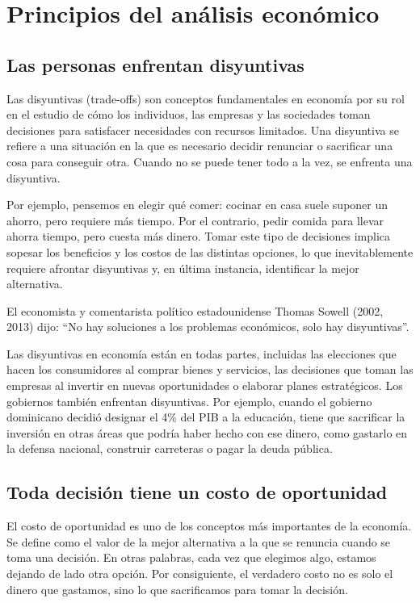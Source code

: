 \documentclass[
  letterpaper,
  DIV=11,
  numbers=noendperiod,
  oneside]{scrreprt}
\begin{document}
\section{Principios del análisis
económico}\label{principios-del-anuxe1lisis-econuxf3mico}

\subsection{Las personas enfrentan
disyuntivas}\label{las-personas-enfrentan-disyuntivas}

Las disyuntivas (trade-offs) son conceptos fundamentales en economía por
su rol en el estudio de cómo los individuos, las empresas y las
sociedades toman decisiones para satisfacer necesidades con recursos
limitados. Una disyuntiva se refiere a una situación en la que es
necesario decidir renunciar o sacrificar una cosa para conseguir otra.
Cuando no se puede tener todo a la vez, se enfrenta una disyuntiva.

Por ejemplo, pensemos en elegir qué comer: cocinar en casa suele suponer
un ahorro, pero requiere más tiempo. Por el contrario, pedir comida para
llevar ahorra tiempo, pero cuesta más dinero. Tomar este tipo de
decisiones implica sopesar los beneficios y los costos de las distintas
opciones, lo que inevitablemente requiere afrontar disyuntivas y, en
última instancia, identificar la mejor alternativa.

El economista y comentarista político estadounidense Thomas Sowell
(2002, 2013) dijo: ``No hay soluciones a los problemas económicos, solo
hay disyuntivas''.

Las disyuntivas en economía están en todas partes, incluidas las
elecciones que hacen los consumidores al comprar bienes y servicios, las
decisiones que toman las empresas al invertir en nuevas oportunidades o
elaborar planes estratégicos. Los gobiernos también enfrentan
disyuntivas. Por ejemplo, cuando el gobierno dominicano decidió designar
el 4\% del PIB a la educación, tiene que sacrificar la inversión en
otras áreas que podría haber hecho con ese dinero, como gastarlo en la
defensa nacional, construir carreteras o pagar la deuda pública.

\subsection{Toda decisión tiene un costo de
oportunidad}\label{toda-decisiuxf3n-tiene-un-costo-de-oportunidad}

El costo de oportunidad es uno de los conceptos más importantes de la
economía. Se define como el valor de la mejor alternativa a la que se
renuncia cuando se toma una decisión. En otras palabras, cada vez que
elegimos algo, estamos dejando de lado otra opción. Por consiguiente, el
verdadero costo no es solo el dinero que gastamos, sino lo que
sacrificamos para tomar la decisión.
\end{document}
